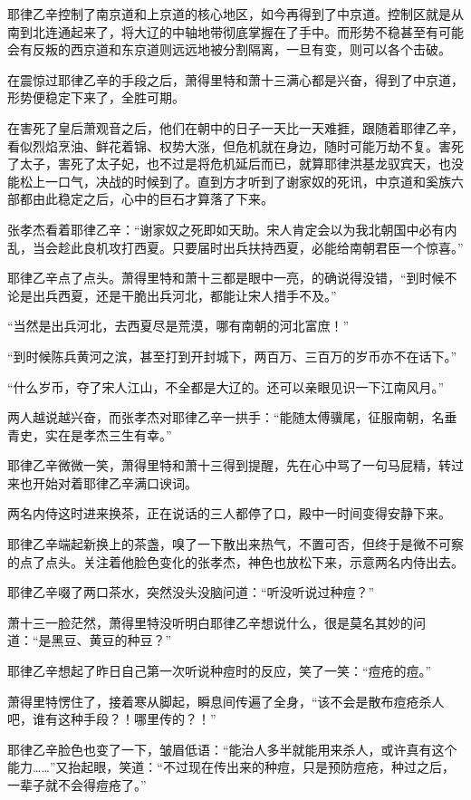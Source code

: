 耶律乙辛控制了南京道和上京道的核心地区，如今再得到了中京道。控制区就是从南到北连通起来了，将大辽的中轴地带彻底掌握在了手中。而形势不稳甚至有可能会有反叛的西京道和东京道则远远地被分割隔离，一旦有变，则可以各个击破。

在震惊过耶律乙辛的手段之后，萧得里特和萧十三满心都是兴奋，得到了中京道，形势便稳定下来了，全胜可期。

在害死了皇后萧观音之后，他们在朝中的日子一天比一天难捱，跟随着耶律乙辛，看似烈焰烹油、鲜花着锦、权势大涨，但危机就在身边，随时可能万劫不复。害死了太子，害死了太子妃，也不过是将危机延后而已，就算耶律洪基龙驭宾天，也没能松上一口气，决战的时候到了。直到方才听到了谢家奴的死讯，中京道和奚族六部都由此稳定之后，心中的巨石才算落了下来。

张孝杰看着耶律乙辛：“谢家奴之死即如天助。宋人肯定会以为我北朝国中必有内乱，当会趁此良机攻打西夏。只要届时出兵扶持西夏，必能给南朝君臣一个惊喜。”

耶律乙辛点了点头。萧得里特和萧十三都是眼中一亮，的确说得没错，“到时候不论是出兵西夏，还是干脆出兵河北，都能让宋人措手不及。”

“当然是出兵河北，去西夏尽是荒漠，哪有南朝的河北富庶！”

“到时候陈兵黄河之滨，甚至打到开封城下，两百万、三百万的岁币亦不在话下。”

“什么岁币，夺了宋人江山，不全都是大辽的。还可以亲眼见识一下江南风月。”

两人越说越兴奋，而张孝杰对耶律乙辛一拱手：“能随太傅骥尾，征服南朝，名垂青史，实在是孝杰三生有幸。”

耶律乙辛微微一笑，萧得里特和萧十三得到提醒，先在心中骂了一句马屁精，转过来也开始对着耶律乙辛满口谀词。

两名内侍这时进来换茶，正在说话的三人都停了口，殿中一时间变得安静下来。

耶律乙辛端起新换上的茶盏，嗅了一下散出来热气，不置可否，但终于是微不可察的点了点头。关注着他脸色变化的张孝杰，神色也放松下来，示意两名内侍出去。

耶律乙辛啜了两口茶水，突然没头没脑问道：“听没听说过种痘？”

萧十三一脸茫然，萧得里特没听明白耶律乙辛想说什么，很是莫名其妙的问道：“是黑豆、黄豆的种豆？”

耶律乙辛想起了昨日自己第一次听说种痘时的反应，笑了一笑：“痘疮的痘。”

萧得里特愣住了，接着寒从脚起，瞬息间传遍了全身，“该不会是散布痘疮杀人吧，谁有这种手段？！哪里传的？！”

耶律乙辛脸色也变了一下，皱眉低语：“能治人多半就能用来杀人，或许真有这个能力……”又抬起眼，笑道：“不过现在传出来的种痘，只是预防痘疮，种过之后，一辈子就不会得痘疮了。”

